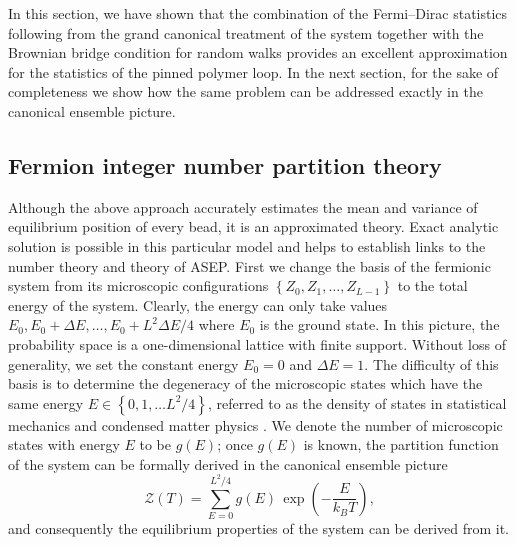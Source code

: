 \documentclass[aps,showpacs,twocolumn,floatfix,prx,superscriptaddress]{revtex4-1}
\begin{document}
In this section, we have shown that the combination of the Fermi--Dirac statistics following from the grand canonical treatment of the system together with the Brownian bridge condition for random walks provides an excellent approximation for the statistics of the pinned polymer loop. In the next section, for the sake of completeness we show how the same problem can be addressed exactly in the canonical ensemble picture.

\subsection{Fermion integer number partition theory}
\label{sec:numberPartition}

Although the above approach accurately estimates the mean and variance of equilibrium position of every bead, it is an approximated theory. Exact analytic solution is possible in this particular model and helps to establish links to the number theory and theory of ASEP. First we change the basis of the fermionic system from its microscopic configurations $\left\{Z_0,Z_1,\ldots,Z_{L-1}\right\}$ to the total energy of the system. Clearly, the energy can only take values $E_0, E_0+\Delta E, \ldots, E_0 + L^2 \Delta E / 4$ where $E_0$ is the ground state. In this picture, the probability space is a one-dimensional lattice with finite support. Without loss of generality, we set the constant energy $E_0=0$ and $\Delta E=1$. The difficulty of this basis is to determine the degeneracy of the microscopic states which have the same energy $E \in \left\{0,1,\ldots L^2/4\right\}$, referred to as the density of states in statistical mechanics \cite{Huang1987} and condensed matter physics \cite{Sander2009}. We denote the number of microscopic states with energy $E$ to be $g(E)$; once $g(E)$ is known, the partition function of the system can be formally derived in the canonical ensemble picture
\begin{equation}
\mathcal{Z}\left(T\right) = \sum_{E=0}^{L^2/4} g(E) \, \exp \left(-\frac{E}{k_B T}\right),
\label{eq:par_func}
\end{equation}
and consequently the equilibrium properties of the system can be derived from it. 
\end{document}
